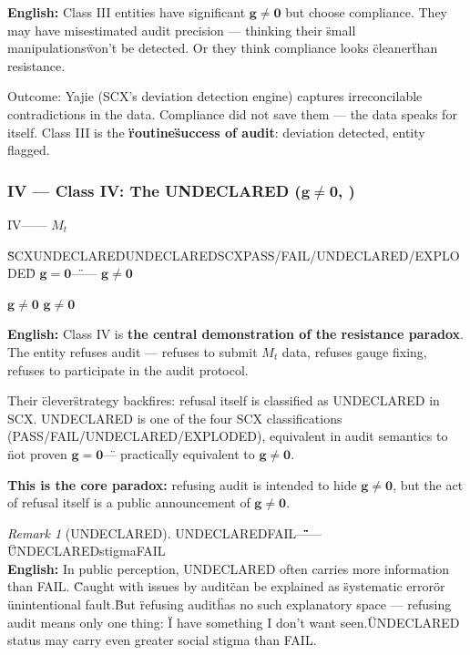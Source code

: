 \documentclass[12pt,a4paper]{article}
\theoremstyle{remark}
\newtheorem{remark}[theorem]{Remark}
\newcommand{\g}{\mathbf{g}}
\begin{document}
\vspace{4pt}
\noindent
\textbf{English:} Class III entities have significant $ \g \neq \mathbf{0} $ but choose compliance. They may have misestimated audit precision — thinking their \"small manipulations\" won't be detected. Or they think compliance looks \"cleaner\" than resistance.

Outcome: Yajie (SCX's deviation detection engine) captures irreconcilable contradictions in the data. Compliance did not save them — the data speaks for itself. Class III is the \textbf{\"routine\" success of audit}: deviation detected, entity flagged.

\subsubsection{IV — Class IV: The UNDECLARED ($ \g \neq \mathbf{0} $, )}

\noindent
\textbf{} IV\textbf{}—— $ M_t $ 

\"\"SCXUNDECLAREDUNDECLAREDSCXPASS/FAIL/UNDECLARED/EXPLODED\" $ \g = \mathbf{0} $\"—— $ \g \neq \mathbf{0} $

\textbf{}  $ \g \neq \mathbf{0} $ $ \g \neq \mathbf{0} $ 

\vspace{4pt}
\noindent
\textbf{English:} Class IV is \textbf{the central demonstration of the resistance paradox}. The entity refuses audit — refuses to submit $ M_t $ data, refuses gauge fixing, refuses to participate in the audit protocol.

Their \"clever\" strategy backfires: refusal itself is classified as UNDECLARED in SCX. UNDECLARED is one of the four SCX classifications (PASS/FAIL/UNDECLARED/EXPLODED), equivalent in audit semantics to \"not proven $ \g = \mathbf{0} $\" — practically equivalent to $ \g \neq \mathbf{0} $.

\textbf{This is the core paradox:} refusing audit is intended to hide $ \g \neq \mathbf{0} $, but the act of refusal itself is a public announcement of $ \g \neq \mathbf{0} $.

\begin{remark}[UNDECLARED]
UNDECLAREDFAIL\"\"\"\"\"\"\"\"——\"\"UNDECLAREDstigmaFAIL\\
\textbf{English:} In public perception, UNDECLARED often carries more information than FAIL. \"Caught with issues by audit\" can be explained as \"systematic error\" or \"unintentional fault.\" But \"refusing audit\" has no such explanatory space — refusing audit means only one thing: \"I have something I don't want seen.\" UNDECLARED status may carry even greater social stigma than FAIL.
\end{remark}
\end{document}
